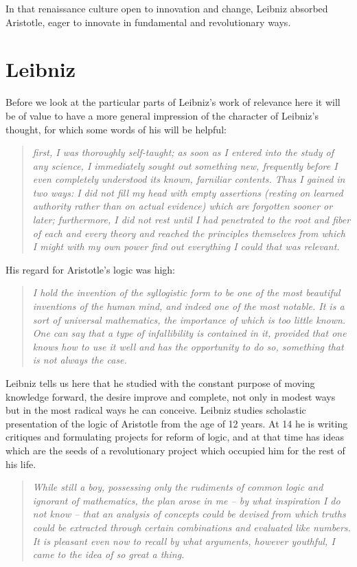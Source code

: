 In that renaissance culture open to innovation and change, Leibniz absorbed Aristotle, eager to innovate in fundamental and revolutionary ways.

\section{Leibniz}

Before we look at the particular parts of Leibniz's work of relevance here it will
be of value to have a more general impression of the character of Leibniz's thought,
for which some words of his will be helpful:

\begin{quotation}
{\it first, I was thoroughly self-taught; as soon as I entered into the study of any science,
I immediately sought out something new, frequently before I even completely understood its known, farniliar contents.
Thus I gained in two ways: I did not fill my head with empty assertions (resting on learned authority rather than on actual evidence) which are forgotten sooner or later; furthermore, I did not rest until I had penetrated to the root and fiber of each and every theory and reached the principles themselves from which I might with my own power find out everything I could that was relevant.}
\end{quotation}

His regard for Aristotle's logic was high:
\begin{quotation}
{\it I hold the invention of the syllogistic form to be one of the most beautiful
inventions of the human mind, and indeed one of the most notable. It is a
sort of universal mathematics, the importance of which is too little
known. One can say that a type of infallibility is contained in it, provided
that one knows how to use it well and has the opportunity to do so,
something that is not always the case.}
\end{quotation}

Leibniz tells us here that he studied with the constant purpose of moving knowledge forward, the desire
improve and complete, not only in modest ways but in the most radical ways he can conceive.
Leibniz studies scholastic presentation of the logic of Aristotle from the age of 12 years.
At 14 he is writing critiques and formulating projects for reform of logic, and at that
time has ideas which are the seeds of a revolutionary project which occupied him for the rest of his life.

\begin{quotation}
{\it While still a boy, possessing only the
rudiments of common logic and ignorant of mathematics, the plan arose in me -- by what inspiration I do
not know -- that an analysis of concepts could be devised from which truths could be extracted through
certain combinations and evaluated like numbers. It is pleasant even now to recall by what arguments,
however youthful, I came to the idea of so great a thing.}
\end{quotation}

